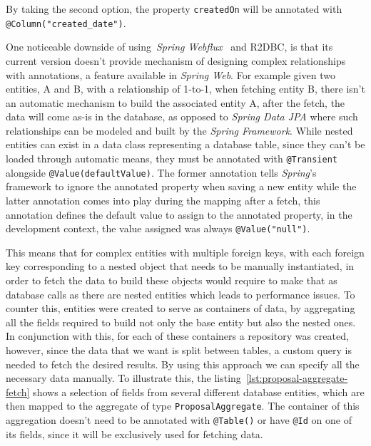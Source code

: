 By taking the second option, the property \lstinline{createdOn} will be annotated with \lstinline[keywordstyle=\color{black},commentstyle=\color{black},stringstyle=\color{black}]{@Column("created_date")}.


One noticeable downside of using~\textit{Spring Webflux}~\cite{spring-webflux} and R2DBC, is that its current version doesn't provide mechanism of designing complex relationships with annotations, a feature available in \textit{Spring Web}. For example given two entities, A and B, with a relationship of 1-to-1, when fetching entity B, there isn't an automatic mechanism to build the associated entity A, after the fetch, the data will come as-is in the database, as opposed to \textit{Spring Data JPA} where such relationships can be modeled and built by the \textit{Spring Framework}. 
While nested entities can exist in a data class representing a database table, since they can't be loaded through automatic means, they must be annotated with \lstinline{@Transient} alongside \lstinline{@Value(defaultValue)}. 
The former annotation tells \textit{Spring}'s framework to ignore the annotated property when saving a new entity while the latter annotation comes into play during the mapping after a fetch, this annotation defines the default value to assign to the annotated property, in the development context, the value assigned was always \lstinline[keywordstyle=\color{black},commentstyle=\color{black},stringstyle=\color{black}]{@Value("null")}. 

This means that for complex entities with multiple foreign keys, with each foreign key corresponding to a nested object that needs to be manually instantiated, in order to fetch the data to build these objects would require to make that as database calls as there are nested entities which leads to performance issues. To counter this, entities were created to serve as containers of data, by aggregating all the fields required to build not only the base entity but also the nested ones. 
In conjunction with this, for each of these containers a repository was created, however, since the data that we want is split between tables, a custom query is needed to fetch the desired results. By using this approach we can specify all the necessary data manually. To illustrate this, the listing~\ref{lst:proposal-aggregate-fetch} shows a selection of fields from several different database entities, which are then mapped to the aggregate of type \lstinline{ProposalAggregate}. The container of this aggregation doesn't need to be annotated with \lstinline{@Table()} or have \lstinline{@Id} on one of its fields, since it will be exclusively used for fetching data.

